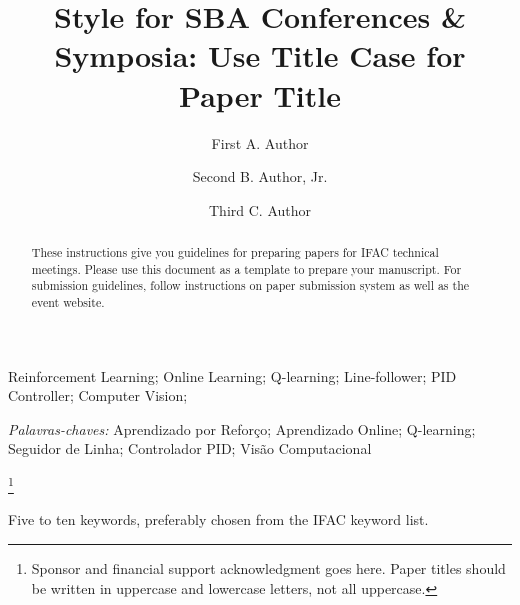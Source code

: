 \documentclass[a4paper]{ifacconf}
\begin{document}
\begin{frontmatter}


\begin{keyword}
Reinforcement Learning; Online Learning; Q-learning; Line-follower; PID Controller; Computer Vision;

\vskip 1mm%
{\noindent\it Palavras-chaves:} Aprendizado por Reforço; Aprendizado Online; Q-learning; Seguidor de Linha; Controlador PID; Visão Computacional
\end{keyword}




\end{frontmatter}
\else
% 

\begin{frontmatter}

\title{Style for SBA Conferences \& Symposia: Use Title Case for
  Paper Title} 

\thanks[footnoteinfo]{Sponsor and financial support acknowledgment
goes here. Paper titles should be written in uppercase and lowercase
letters, not all uppercase.}

\author[First]{First A. Author} 
\author[Second]{Second B. Author, Jr.} 
\author[Third]{Third C. Author}


\address[First]{Faculdade de Engenharia Elétrica, Universidade do Triângulo, MG, (e-mail: autor1@faceg@univt.br).}
\address[Second]{Faculdade de Engenharia de Controle \& Automação, Universidade do Futuro, RJ (e-mail: autor2@feca.unifutu.rj)}
\address[Third]{Electrical Engineering Department, 
   Seoul National University, Seoul, Korea, (e-mail: author3@snu.ac.kr)}
   
\renewcommand{\abstractname}{{\bf Abstract:~}}   
   
\begin{abstract}                %
These instructions give you guidelines for preparing papers for IFAC
technical meetings. Please use this document as a template to prepare
your manuscript. For submission guidelines, follow instructions on
paper submission system as well as the event website.
\end{abstract}

\begin{keyword}
Five to ten keywords, preferably chosen from the IFAC keyword list.
\end{keyword}

\end{frontmatter}
\fi
\end{document}
